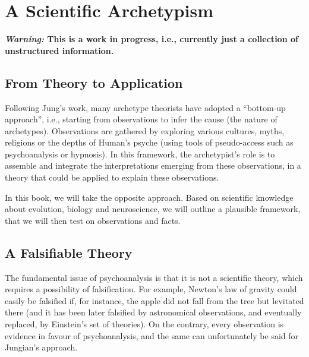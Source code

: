 \documentclass[
]{book}
\begin{document}
\hypertarget{a-scientific-archetypism}{%
\chapter{A Scientific Archetypism}\label{a-scientific-archetypism}}

\textbf{\emph{Warning:} This is a work in progress, i.e., currently just a collection of unstructured information.}

\hypertarget{from-theory-to-application}{%
\section{From Theory to Application}\label{from-theory-to-application}}

Following Jung's work, many archetype theorists have adopted a ``bottom-up approach'', i.e., starting from observations to infer the cause (the nature of archetypes). Observations are gathered by exploring various cultures, myths, religions or the depths of Human's psyche (using tools of pseudo-access such as psychoanalysis or hypnosis). In this framework, the archetypist's role is to assemble and integrate the interpretations emerging from these observations, in a theory that could be applied to explain these observations.

In this book, we will take the opposite approach. Based on scientific knowledge about evolution, biology and neuroscience, we will outline a plausible framework, that we will then test on observations and facts.

\hypertarget{a-falsifiable-theory}{%
\section{A Falsifiable Theory}\label{a-falsifiable-theory}}

The fundamental issue of psychoanalysis is that it is not a scientific theory, which requires a possibility of falsification. For example, Newton's law of gravity could easily be falsified if, for instance, the apple did not fall from the tree but levitated there (and it has been later falsified by astronomical observations, and eventually replaced, by Einstein's set of theories). On the contrary, every observation is evidence in favour of psychoanalysis, and the same can unfortunately be said for Jungian's approach.
\end{document}
